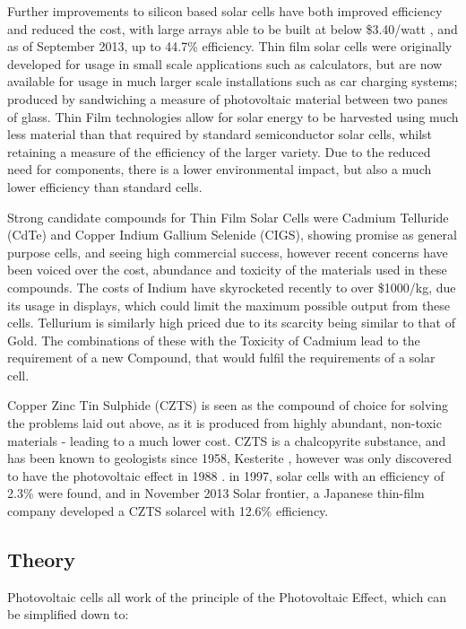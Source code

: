 Further improvements to silicon based solar cells have both improved efficiency and reduced the cost, with large arrays able to be built at below \$3.40/watt \citep{_solar_????}, and as of September 2013, up to 44.7\% efficiency. \citep{_solar_????-1} Thin film solar cells were originally developed for usage in small scale applications such as calculators, but are now available for usage in much larger scale installations such as car charging systems; produced by sandwiching a measure of photovoltaic material between two panes of glass. Thin Film technologies allow for solar energy to be harvested using much less material than that required by standard semiconductor solar cells, whilst retaining a measure of the efficiency of the larger variety. Due to the reduced need for components, there is a lower environmental impact, but also a much lower efficiency than standard cells.

Strong candidate compounds for Thin Film Solar Cells were Cadmium Telluride (CdTe) and Copper Indium Gallium Selenide (CIGS), showing promise as general purpose cells, and seeing high commercial success, however recent concerns have been voiced over the cost, abundance and toxicity of the materials used in these compounds. The costs of Indium have skyrocketed recently to over \$1000/kg, \citep{_slide_????}
due its usage in displays, which could limit the maximum possible output from these cells. Tellurium is similarly high priced due to its scarcity being similar to that of Gold. The combinations of these with the Toxicity of Cadmium lead to the requirement of a new Compound, that would fulfil the requirements of a solar cell.

Copper Zinc Tin Sulphide (CZTS) is seen as the compound of choice for solving the problems laid out above, as it is produced from highly abundant, non-toxic materials - leading to a much lower cost. \citep{wadia_materials_2009}
CZTS is a chalcopyrite substance, and has been known to geologists since 1958, Kesterite \citep{_kesterite_????}, however was only discovered to have the photovoltaic effect in 1988 \citep{ito_electrical_1988}. in 1997, solar cells with an efficiency of 2.3\% were found, and in November 2013 Solar frontier, a Japanese thin-film company developed a CZTS solarcel with 12.6\% efficiency. \citep{wang_device_2013}

\subsection{Theory}
	Photovoltaic cells all work of the principle of the Photovoltaic Effect, which can be simplified down to:

